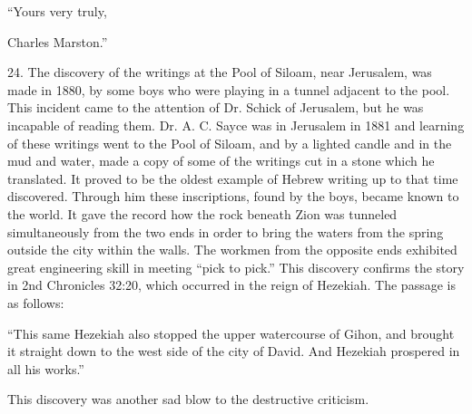 ``Yours very truly,

Charles Marston.''

24. The discovery of the writings at the Pool of Siloam, near Jerusalem, was made in 1880,
by some boys who were playing in a tunnel adjacent to the pool. This incident came to the
attention of Dr. Schick of Jerusalem, but he was incapable of reading them. Dr. A. C. Sayce
was in Jerusalem in 1881 and learning of these writings went to the Pool of Siloam, and by a
lighted candle and in the mud and water, made a copy of some of the writings cut in a stone
which he translated. It proved to be the oldest example of Hebrew writing up to that time
discovered. Through him these inscriptions, found by the boys, became known to the world.
It gave the record how the rock beneath Zion was tunneled simultaneously from the two ends
in order to bring the waters from the spring outside the city within the walls. The workmen
from the opposite ends exhibited great engineering skill in meeting ``pick to pick.'' This
discovery confirms the story in 2nd Chronicles 32:20, which occurred in the reign of
Hezekiah. The passage is as follows:

``This same Hezekiah also stopped the upper watercourse of Gihon, and brought it straight
down to the west side of the city of David. And Hezekiah prospered in all his works.''

This discovery was another sad blow to the destructive criticism.

